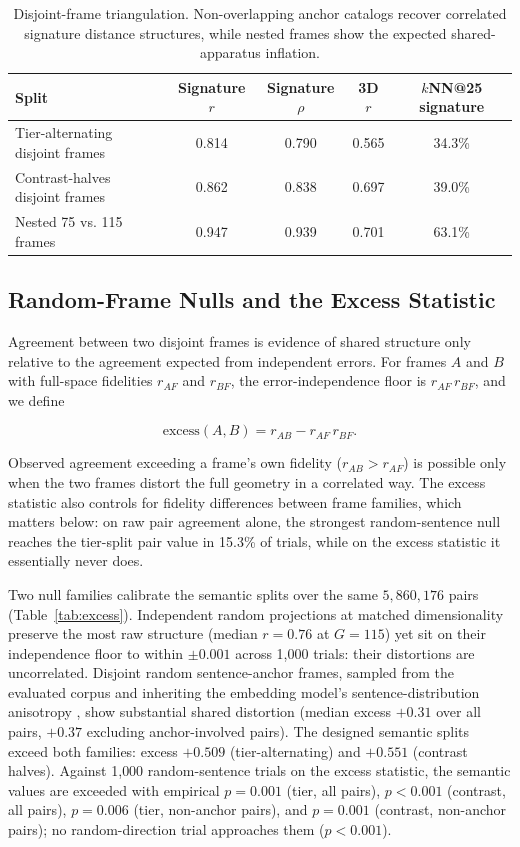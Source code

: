 \documentclass[11pt]{article}
\begin{document}
\begin{table}[t]
\centering
\small
\begin{tabular}{@{}lcccc@{}}
\toprule
Split & Signature $r$ & Signature $\rho$ & 3D $r$ & $k$NN@25 signature \\
\midrule
Tier-alternating disjoint frames & 0.814 & 0.790 & 0.565 & 34.3\% \\
Contrast-halves disjoint frames & 0.862 & 0.838 & 0.697 & 39.0\% \\
Nested 75 vs. 115 frames & 0.947 & 0.939 & 0.701 & 63.1\% \\
\bottomrule
\end{tabular}
\caption{Disjoint-frame triangulation. Non-overlapping anchor catalogs recover correlated signature distance structures, while nested frames show the expected shared-apparatus inflation.}
\label{tab:disjoint}
\end{table}


\subsection{Random-Frame Nulls and the Excess Statistic}
\label{sec:excess}

Agreement between two disjoint frames is evidence of shared structure only relative to the agreement expected from independent errors. For frames $A$ and $B$ with full-space fidelities $r_{AF}$ and $r_{BF}$, the error-independence floor is $r_{AF}\,r_{BF}$, and we define

\begin{equation}
\mathrm{excess}(A,B)=r_{AB}-r_{AF}\,r_{BF}.
\end{equation}

Observed agreement exceeding a frame's own fidelity ($r_{AB}>r_{AF}$) is possible only when the two frames distort the full geometry in a correlated way. The excess statistic also controls for fidelity differences between frame families, which matters below: on raw pair agreement alone, the strongest random-sentence null reaches the tier-split pair value in 15.3\% of trials, while on the excess statistic it essentially never does.

Two null families calibrate the semantic splits over the same $5{,}860{,}176$ pairs (Table~\ref{tab:excess}). Independent random projections at matched dimensionality preserve the most raw structure (median $r=0.76$ at $G=115$) yet sit on their independence floor to within $\pm0.001$ across 1{,}000 trials: their distortions are uncorrelated. Disjoint random sentence-anchor frames, sampled from the evaluated corpus and inheriting the embedding model's sentence-distribution anisotropy \citep{ethayarajh2019contextual}, show substantial shared distortion (median excess $+0.31$ over all pairs, $+0.37$ excluding anchor-involved pairs). The designed semantic splits exceed both families: excess $+0.509$ (tier-alternating) and $+0.551$ (contrast halves). Against 1{,}000 random-sentence trials on the excess statistic, the semantic values are exceeded with empirical $p=0.001$ (tier, all pairs), $p<0.001$ (contrast, all pairs), $p=0.006$ (tier, non-anchor pairs), and $p=0.001$ (contrast, non-anchor pairs); no random-direction trial approaches them ($p<0.001$).
\end{document}
